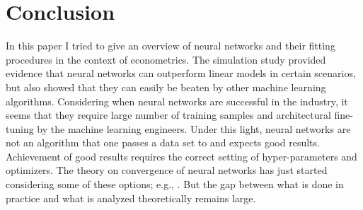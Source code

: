 \section{Conclusion}
\label{seq:conclusion}

In this paper I tried to give an overview of neural networks and their fitting
procedures in the context of econometrics. The simulation study provided evidence that
neural networks can outperform linear models in certain scenarios, but also showed
that they can easily be beaten by other machine learning algorithms. Considering when
neural networks are successful in the industry, it seems that they require large number
of training samples and architectural fine-tuning by the machine learning engineers.
Under this light, neural networks are not an algorithm that one passes a data set to and
expects good results. Achievement of good results requires the correct setting of
hyper-parameters and optimizers. The theory on convergence of neural networks has just
started considering some of these options; e.g., \cite{Braun.2019}. But the gap between
what is done in practice and what is analyzed theoretically remains large.
